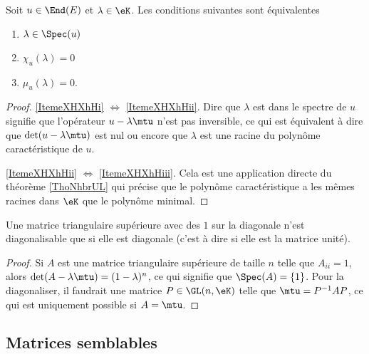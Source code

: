 \begin{theorem}
    Soit \( u\in\End(E)\) et \( \lambda\in\eK\). Les conditions suivantes sont équivalentes
    \begin{enumerate}
        \item\label{ItemeXHXhHi}
            \( \lambda\in\Spec(u)\)
        \item\label{ItemeXHXhHii}
            \( \chi_u(\lambda)=0\)
        \item\label{ItemeXHXhHiii}
            \( \mu_u(\lambda)=0\).
    \end{enumerate}
\end{theorem}

\begin{proof}
    \ref{ItemeXHXhHi} \( \Leftrightarrow\) \ref{ItemeXHXhHii}. Dire que \( \lambda\) est dans le spectre de \( u\) signifie que l'opérateur \( u-\lambda\mtu\) n'est pas inversible, ce qui est équivalent à dire que \( \det(u-\lambda\mtu)\) est nul ou encore que \( \lambda\) est une racine du polynôme caractéristique de \( u\). 

    \ref{ItemeXHXhHii} \( \Leftrightarrow\) \ref{ItemeXHXhHiii}. Cela est une application directe du théorème \ref{ThoNhbrUL} qui précise que le polynôme caractéristique a les mêmes racines dans \(\eK\) que le polynôme minimal.
\end{proof}

\begin{lemma}
    Une matrice triangulaire supérieure avec des \( 1\) sur la diagonale n'est diagonalisable que si elle est diagonale (c'est à dire si elle est la matrice unité).
\end{lemma}

\begin{proof}
    Si \( A\) est une matrice triangulaire supérieure de taille \( n\) telle que \( A_{ii}=1\), alors \( \det(A-\lambda\mtu)=(1-\lambda)^n\), ce qui signifie que \( \Spec(A)=\{ 1 \}\). Pour la diagonaliser, il faudrait une matrice \( P\in\GL(n,\eK)\) telle que \( \mtu=P^{-1}AP\), ce qui est uniquement possible si \( A=\mtu\).
\end{proof}


\subsection{Matrices semblables}

